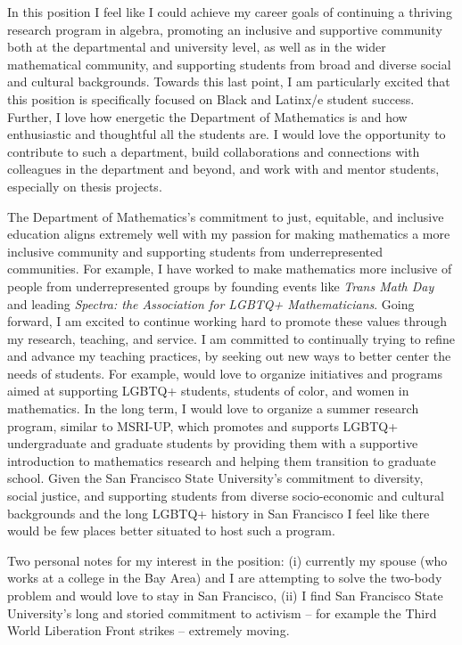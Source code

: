 \documentclass[11pt]{article}
\begin{document}
In this position I feel like I could achieve my career goals of continuing a thriving research program in algebra, promoting an inclusive and supportive community both at the departmental and university level, as well as in the wider mathematical community, and supporting students from broad and diverse social and cultural backgrounds. Towards this last point, I am particularly excited that this position is specifically focused on Black and Latinx/e student success. Further, I love how energetic the Department of Mathematics is and how enthusiastic and thoughtful all the students are. I would love the opportunity to contribute to such a department, build collaborations and connections with colleagues in the department and beyond, and work with and mentor students, especially on thesis projects. 
 
The Department of Mathematics's commitment to just, equitable, and inclusive education aligns extremely well with my passion for making mathematics a more inclusive community and supporting students from underrepresented communities. For example, I have worked to make mathematics more inclusive of people from underrepresented groups by founding events like \textit{Trans Math Day} and leading \textit{Spectra: the Association for LGBTQ+ Mathematicians}. Going forward, I am excited to continue working hard to promote these values through my research, teaching, and service. I am committed to continually trying to refine and advance my teaching practices, by seeking out new ways to better center the needs of students. For example, would love to organize initiatives and programs aimed at supporting LGBTQ+ students, students of color, and women in mathematics. In the long term, I would love to organize a summer research program, similar to MSRI-UP, which promotes and supports LGBTQ+ undergraduate and graduate students by providing them with a supportive introduction to mathematics research and helping them transition to graduate school. Given the San Francisco State University's commitment to diversity, social justice, and supporting students from diverse socio-economic and cultural backgrounds and the long LGBTQ+ history in San Francisco I feel like there would be few places better situated to host such a program. 

Two personal notes for my interest in the position: (i) currently my spouse (who works at a college in the Bay Area) and I are attempting to solve the two-body problem and would love to stay in San Francisco, (ii) I find San Francisco State University's long and storied commitment to activism -- for example the Third World Liberation Front strikes -- extremely moving. 
\end{document}
